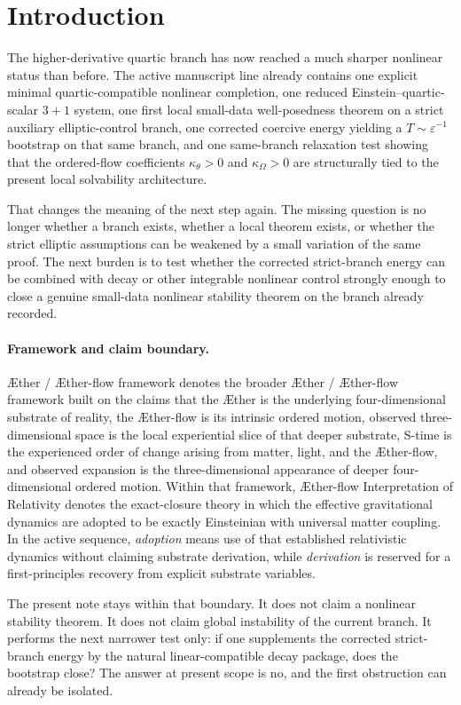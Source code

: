 \documentclass[11pt]{article}
\newcommand{\Aether}{\AE{}ther}
\newcommand{\Aflow}{\AE{}ther-flow}
\newcommand{\TheoryName}{\Aflow{} Interpretation of Relativity}
\newcommand{\TheoryProgram}{\Aether{} / \Aflow{} framework}
\begin{document}
\section{Introduction}

The higher-derivative quartic branch has now reached a much sharper nonlinear status than before. The active manuscript line already contains one explicit minimal quartic-compatible nonlinear completion, one reduced Einstein--quartic-scalar \(3+1\) system, one first local small-data well-posedness theorem on a strict auxiliary elliptic-control branch, one corrected coercive energy yielding a \(T\sim \varepsilon^{-1}\) bootstrap on that same branch, and one same-branch relaxation test showing that the ordered-flow coefficients \(\kappa_\theta>0\) and \(\kappa_\Omega>0\) are structurally tied to the present local solvability architecture.

That changes the meaning of the next step again. The missing question is no longer whether a branch exists, whether a local theorem exists, or whether the strict elliptic assumptions can be weakened by a small variation of the same proof. The next burden is to test whether the corrected strict-branch energy can be combined with decay or other integrable nonlinear control strongly enough to close a genuine small-data nonlinear stability theorem on the branch already recorded.

\paragraph{Framework and claim boundary.}
\TheoryProgram{} denotes the broader \Aether{} / \Aflow{} framework built on the claims that the \Aether{} is the underlying four-dimensional substrate of reality, the \Aflow{} is its intrinsic ordered motion, observed three-dimensional space is the local experiential slice of that deeper substrate, S-time is the experienced order of change arising from matter, light, and the \Aflow{}, and observed expansion is the three-dimensional appearance of deeper four-dimensional ordered motion. Within that framework, \TheoryName{} denotes the exact-closure theory in which the effective gravitational dynamics are adopted to be exactly Einsteinian with universal matter coupling. In the active sequence, \emph{adoption} means use of that established relativistic dynamics without claiming substrate derivation, while \emph{derivation} is reserved for a first-principles recovery from explicit substrate variables.

The present note stays within that boundary. It does not claim a nonlinear stability theorem. It does not claim global instability of the current branch. It performs the next narrower test only: if one supplements the corrected strict-branch energy by the natural linear-compatible decay package, does the bootstrap close? The answer at present scope is no, and the first obstruction can already be isolated.
\end{document}

